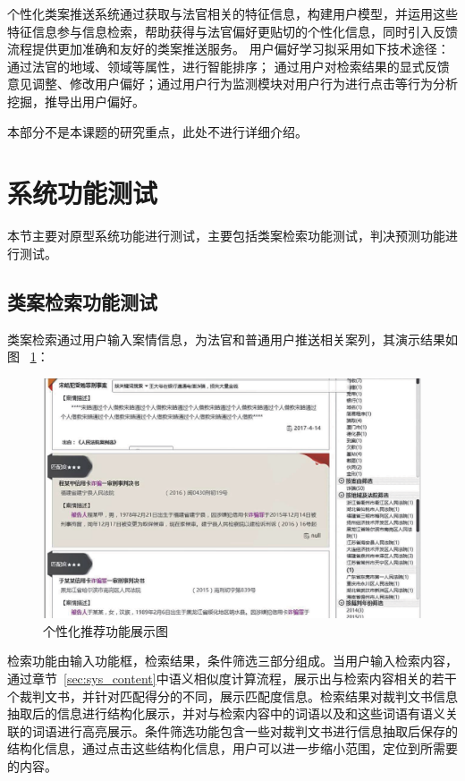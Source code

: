 个性化类案推送系统通过获取与法官相关的特征信息，构建用户模型，并运用这些特征信息参与信息检索，帮助获得与法官偏好更贴切的个性化信息，同时引入反馈流程提供更加准确和友好的类案推送服务。 用户偏好学习拟采用如下技术途径： 通过法官的地域、领域等属性，进行智能排序； 通过用户对检索结果的显式反馈意见调整、修改用户偏好；通过用户行为监测模块对用户行为进行点击等行为分析挖掘，推导出用户偏好。

本部分不是本课题的研究重点，此处不进行详细介绍。



\section{系统功能测试}
本节主要对原型系统功能进行测试，主要包括类案检索功能测试，判决预测功能进行测试。
\subsection{类案检索功能测试}
类案检索通过用户输入案情信息，为法官和普通用户推送相关案列，其演示结果如图
~\ref{fig:sys_search}：
\begin{figure}[htbp]%
    \centering
    \includegraphics[scale=0.3, clip=true]{./sources/sys_search.eps}
    \caption{\label{fig:sys_search}个性化推荐功能展示图}
\end{figure}

检索功能由输入功能框，检索结果，条件筛选三部分组成。当用户输入检索内容，通过章节~\ref{sec:sys_content}中语义相似度计算流程，展示出与检索内容相关的若干个裁判文书，并针对匹配得分的不同，展示匹配度信息。检索结果对裁判文书信息抽取后的信息进行结构化展示，并对与检索内容中的词语以及和这些词语有语义关联的词语进行高亮展示。条件筛选功能包含一些对裁判文书进行信息抽取后保存的结构化信息，通过点击这些结构化信息，用户可以进一步缩小范围，定位到所需要的内容。

